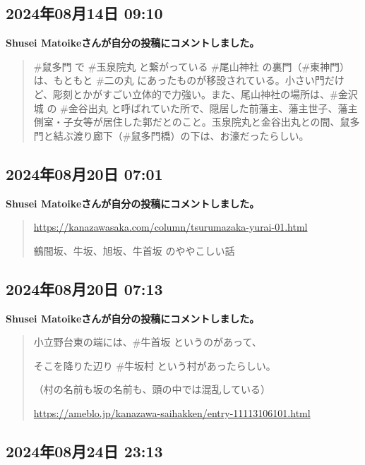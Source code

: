 \subsection*{2024年08月14日 09:10}

\textbf{Shusei Matoikeさんが自分の投稿にコメントしました。}

\begin{quote}
\#鼠多門 で \#玉泉院丸 と繋がっている \#尾山神社 の裏門（\#東神門）は、もともと \#二の丸 にあったものが移設されている。小さい門だけど、彫刻とかがすごい立体的で力強い。また、尾山神社の場所は、\#金沢城 の \#金谷出丸 と呼ばれていた所で、隠居した前藩主、藩主世子、藩主側室・子女等が居住した郭だとのこと。玉泉院丸と金谷出丸との間、鼠多門と結ぶ渡り廊下（\#鼠多門橋）の下は、お濠だったらしい。
\end{quote}

\subsection*{2024年08月20日 07:01}

\textbf{Shusei Matoikeさんが自分の投稿にコメントしました。}

\begin{quote}
\url{https://kanazawasaka.com/column/tsurumazaka-yurai-01.html}

鶴間坂、牛坂、旭坂、牛首坂 のややこしい話
\end{quote}

\subsection*{2024年08月20日 07:13}

\textbf{Shusei Matoikeさんが自分の投稿にコメントしました。}

\begin{quote}
小立野台東の端には、\#牛首坂 というのがあって、

そこを降りた辺り \#牛坂村 という村があったらしい。

（村の名前も坂の名前も、頭の中では混乱している）

\url{https://ameblo.jp/kanazawa-saihakken/entry-11113106101.html}
\end{quote}

\subsection*{2024年08月24日 23:13}

